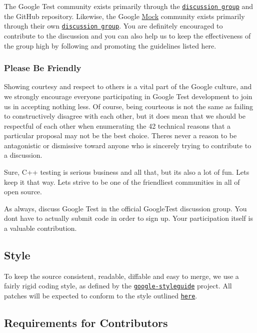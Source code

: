 The Google Test community exists primarily through the \href{http://groups.google.com/group/googletestframework}{\tt discussion group} and the Git\+Hub repository. Likewise, the Google \hyperlink{classMock}{Mock} community exists primarily through their own \href{http://groups.google.com/group/googlemock}{\tt discussion group}. You are definitely encouraged to contribute to the discussion and you can also help us to keep the effectiveness of the group high by following and promoting the guidelines listed here.

\subsubsection*{Please Be Friendly}

Showing courtesy and respect to others is a vital part of the Google culture, and we strongly encourage everyone participating in Google Test development to join us in accepting nothing less. Of course, being courteous is not the same as failing to constructively disagree with each other, but it does mean that we should be respectful of each other when enumerating the 42 technical reasons that a particular proposal may not be the best choice. There\textquotesingle{}s never a reason to be antagonistic or dismissive toward anyone who is sincerely trying to contribute to a discussion.

Sure, C++ testing is serious business and all that, but it\textquotesingle{}s also a lot of fun. Let\textquotesingle{}s keep it that way. Let\textquotesingle{}s strive to be one of the friendliest communities in all of open source.

As always, discuss Google Test in the official Google\+Test discussion group. You don\textquotesingle{}t have to actually submit code in order to sign up. Your participation itself is a valuable contribution.

\subsection*{Style}

To keep the source consistent, readable, diffable and easy to merge, we use a fairly rigid coding style, as defined by the \href{https://github.com/google/styleguide}{\tt google-\/styleguide} project. All patches will be expected to conform to the style outlined \href{https://google.github.io/styleguide/cppguide.html}{\tt here}.

\subsection*{Requirements for Contributors}

